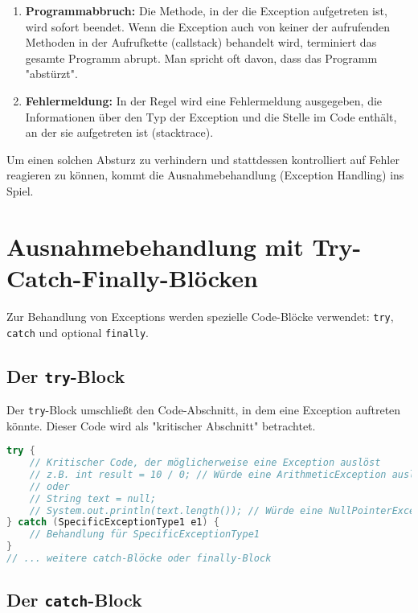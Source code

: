 \begin{enumerate}
    \item \textbf{Programmabbruch:} Die Methode, in der die Exception aufgetreten ist, wird sofort beendet. Wenn die Exception auch von keiner der aufrufenden Methoden in der Aufrufkette (\gls{callstack}) behandelt wird, terminiert das gesamte Programm abrupt. Man spricht oft davon, dass das Programm "abstürzt".
    \item \textbf{Fehlermeldung:} In der Regel wird eine Fehlermeldung ausgegeben, die Informationen über den Typ der Exception und die Stelle im Code enthält, an der sie aufgetreten ist (\gls{stacktrace}).
\end{enumerate}

Um einen solchen Absturz zu verhindern und stattdessen kontrolliert auf Fehler reagieren zu können, kommt die Ausnahmebehandlung (Exception Handling) ins Spiel.

\section{Ausnahmebehandlung mit Try-Catch-Finally-Blöcken}

Zur Behandlung von Exceptions werden spezielle Code-Blöcke verwendet: \texttt{try}, \texttt{catch} und optional \texttt{finally}.

\subsection{Der \texttt{try}-Block}

Der \texttt{try}-Block umschließt den Code-Abschnitt, in dem eine Exception auftreten könnte. Dieser Code wird als "kritischer Abschnitt" betrachtet.

\begin{lstlisting}[language=Java, caption={Beispiel für einen try-Block}, label=lst:tryblock_beispiel]
try {
    // Kritischer Code, der möglicherweise eine Exception auslöst
    // z.B. int result = 10 / 0; // Würde eine ArithmeticException auslösen
    // oder
    // String text = null;
    // System.out.println(text.length()); // Würde eine NullPointerException auslösen
} catch (SpecificExceptionType1 e1) {
    // Behandlung für SpecificExceptionType1
}
// ... weitere catch-Blöcke oder finally-Block
\end{lstlisting}

\subsection{Der \texttt{catch}-Block}

